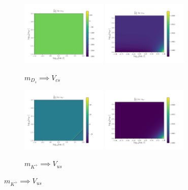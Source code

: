 \documentclass[11pt]{article}
\begin{document}
\newpage
\begin{figure}[H]\ContinuedFloat
    \centering
    \begin{subfigure}[b]{\textwidth}
        \centering
        \includegraphics[width=0.45\textwidth]{heatmaps/mDs-rH0.png}
        \includegraphics[width=0.45\textwidth]{heatmaps/mDs-rH1.png}
        \caption{$m_{D_s} \implies V_{cs}$}
    \end{subfigure}
    \begin{subfigure}[b]{\textwidth}
        \centering
        \includegraphics[width=0.45\textwidth]{heatmaps/mK-rH0.png}
        \includegraphics[width=0.45\textwidth]{heatmaps/mK-rH1.png}
        \caption{$m_{K^+} \implies V_{us}$}
    \end{subfigure}

\end{figure}
\end{document}
